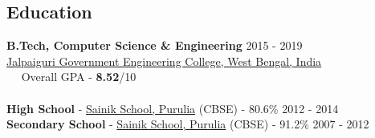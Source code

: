 \documentclass[margin, centered, a4paper]{res}
\begin{document}
\begin{resume}
\section{Education}
\textbf{B.Tech, Computer Science \& Engineering} \hfill 2015 - 2019 \\
\href{http://jgec.ac.in/}{Jalpaiguri Government Engineering College, West Bengal, India} \\
~\textbullet~ Overall GPA - \textbf{8.52}/10
\\
\\
\textbf{High School} - \href{http://sainikschoolpurulia.com/}{Sainik School, Purulia} (CBSE) - 80.6\% \hfill 2012 - 2014 \\
\textbf{Secondary School} - \href{http://sainikschoolpurulia.com/}{Sainik School, Purulia} (CBSE) - 91.2\% \hfill 2007 - 2012



\end{resume}
\end{document}
